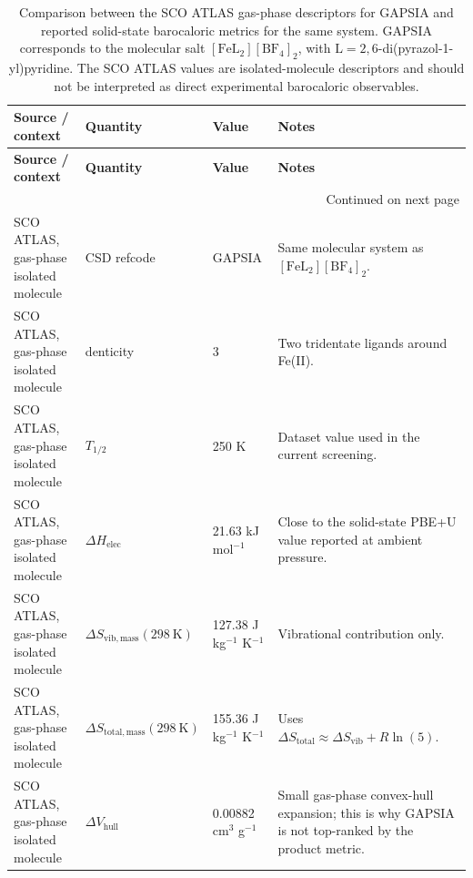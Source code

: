 \begin{longtable}{p{} p{} p{} p{}}
\caption{Comparison between the SCO ATLAS gas-phase descriptors for GAPSIA and reported solid-state barocaloric metrics for the same system. GAPSIA corresponds to the molecular salt $[\mathrm{FeL}_2][\mathrm{BF}_4]_2$, with $\mathrm{L}=2,6$-di(pyrazol-1-yl)pyridine. The SCO ATLAS values are isolated-molecule descriptors and should not be interpreted as direct experimental barocaloric observables.}
\label{tab:gapsia_landmark_bce}\\
\toprule
\textbf{Source / context} & \textbf{Quantity} & \textbf{Value} & \textbf{Notes} \\
\midrule
\endfirsthead

\toprule
\textbf{Source / context} & \textbf{Quantity} & \textbf{Value} & \textbf{Notes} \\
\midrule
\endhead

\midrule
\multicolumn{4}{r}{Continued on next page} \\
\midrule
\endfoot

\bottomrule
\endlastfoot

SCO ATLAS, gas-phase isolated molecule
& CSD refcode
& GAPSIA
& Same molecular system as $[\mathrm{FeL}_2][\mathrm{BF}_4]_2$. \\

SCO ATLAS, gas-phase isolated molecule
& denticity
& 3
& Two tridentate ligands around Fe(II). \\

SCO ATLAS, gas-phase isolated molecule
& $T_{1/2}$
& 250 K
& Dataset value used in the current screening. \\

SCO ATLAS, gas-phase isolated molecule
& $\Delta H_{\mathrm{elec}}$
& 21.63 kJ mol$^{-1}$
& Close to the solid-state PBE+U value reported at ambient pressure. \\

SCO ATLAS, gas-phase isolated molecule
& $\Delta S_{\mathrm{vib,mass}}(298~\mathrm{K})$
& 127.38 J kg$^{-1}$ K$^{-1}$
& Vibrational contribution only. \\

SCO ATLAS, gas-phase isolated molecule
& $\Delta S_{\mathrm{total,mass}}(298~\mathrm{K})$
& 155.36 J kg$^{-1}$ K$^{-1}$
& Uses $\Delta S_{\mathrm{total}}\approx \Delta S_{\mathrm{vib}} + R\ln(5)$. \\

SCO ATLAS, gas-phase isolated molecule
& $\Delta V_{\mathrm{hull}}$
& 0.00882 cm$^{3}$ g$^{-1}$
& Small gas-phase convex-hull expansion; this is why GAPSIA is not top-ranked by the product metric. \\


\end{longtable}
